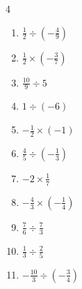\begin{multicols}{4}
\begin{enumerate}
        \phantom{$\displaystyle =21$}

  \item $\displaystyle \frac{1}{2}\div{}\left(-\frac{4}{9}\right)$


  \item $\displaystyle \frac{1}{2}\times{}\left(-\frac{3}{7}\right)$


\columnbreak %

  \item $\displaystyle \frac{10}{9}\div{}5$


  \item $\displaystyle 1\div{}\left(-6\right)$


  \item $\displaystyle -\frac{1}{2}\times{}\left(-1\right)$


  \item $\displaystyle \frac{4}{5}\div{}\left(-\frac{1}{3}\right)$


  \item $\displaystyle -2\times{}\frac{1}{7}$


  \item $\displaystyle -\frac{4}{3}\times{}\left(-\frac{1}{4}\right)$


  \item $\displaystyle \frac{7}{6}\div{}\frac{7}{3}$


  \item $\displaystyle \frac{1}{3}\div{}\frac{2}{5}$


  \item $\displaystyle -\frac{10}{3}\div{}\left(-\frac{3}{4}\right)$



\end{enumerate}
\end{multicols}
